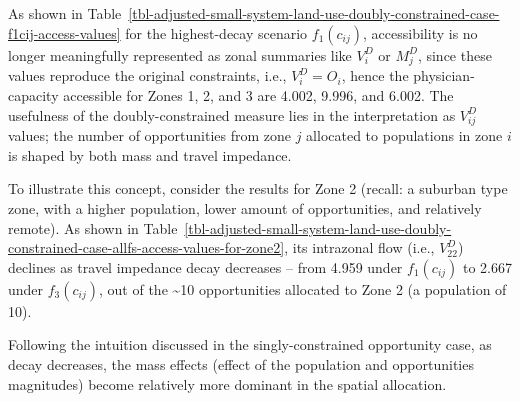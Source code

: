 \documentclass[
  10pt,
  letterpaper,
]{article}
\begin{document}
As shown in
Table~\ref{tbl-adjusted-small-system-land-use-doubly-constrained-case-f1cij-access-values}
for the highest-decay scenario \(f_1(c_{ij})\), accessibility is no
longer meaningfully represented as zonal summaries like \(V^D_i\) or
\(M^D_j\), since these values reproduce the original constraints, i.e.,
\(V^D_i = O_i\), hence the physician-capacity accessible for Zones 1, 2,
and 3 are 4.002, 9.996, and 6.002. The usefulness of the
doubly-constrained measure lies in the interpretation as \(V_{ij}^D\)
values; the number of opportunities from zone \(j\) allocated to
populations in zone \(i\) is shaped by both mass and travel impedance.

To illustrate this concept, consider the results for Zone 2 (recall: a
suburban type zone, with a higher population, lower amount of
opportunities, and relatively remote). As shown in
Table~\ref{tbl-adjusted-small-system-land-use-doubly-constrained-case-allfs-access-values-for-zone2},
its intrazonal flow (i.e., \(V^D_{22}\)) declines as travel impedance
decay decreases -- from 4.959 under \(f_1(c_{ij})\) to 2.667 under
\(f_3(c_{ij})\), out of the \textasciitilde10 opportunities allocated to
Zone 2 (a population of 10).

Following the intuition discussed in the singly-constrained opportunity
case, as decay decreases, the mass effects (effect of the population and
opportunities magnitudes) become relatively more dominant in the spatial
allocation.
\end{document}
